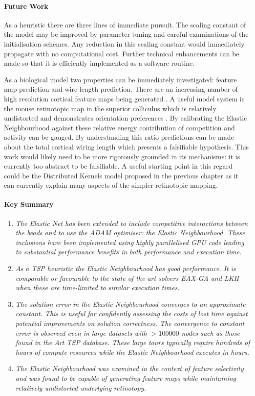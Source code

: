 \paragraph{Future Work}
As a heuristic there are three lines of immediate pursuit. The scaling constant of the model may be improved by parameter tuning and careful examinations of the initialisation schemes. Any reduction in this scaling constant would immediately propagate with no computational cost. Further technical enhancements can be made so that it is efficiently implemented as a software routine.

As a biological model two properties can be immediately investigated: feature map prediction and wire-length prediction. There are an increasing number of high resolution cortical feature maps being generated \cite{Bednar2016-lg}. A useful model system is the mouse retinotopic map in the superior colliculus which is relatively undistorted and demonstrates orientation preferences \cite{Feinberg2014-mj}. By calibrating the Elastic Neighbourhood against these relative energy contribution of competition and activity can be gauged. By understanding this ratio predictions can be made about the total cortical wiring length which presents a falsifiable hypothesis. This work would likely need to be more rigorously grounded in its mechanisms: it is currently too abstract to be falsifiable. A useful starting point in this regard could be the Distributed Kernels model proposed in the previous chapter as it can currently explain many aspects of the simpler retinotopic mapping.

\paragraph{Key Summary}
\begin{enumerate}
	\item \textit{The Elastic Net has been extended to include competitive interactions between the beads and to use the ADAM optimiser: the Elastic Neighbourhood. These inclusions have been implemented using highly parallelised GPU code leading to substantial performance benefits in both performance and execution time.}
	\item \textit{As a TSP heuristic the Elastic Neighbourhood has good performance. It is comparable or favourable to the state of the art solvers EAX-GA and LKH when these are time-limited to similar execution times.}
	\item \textit{The solution error in the Elastic Neighbourhood converges to an approximate constant. This is useful for confidently assessing the costs of lost time against potential improvements on solution correctness. The convergence to constant error is observed even in large datasets with $>100000$ nodes such as those found in the Art TSP database. These large tours typically require hundreds of hours of compute resources while the Elastic Neighbourhood executes in hours.}
	\item \textit{The Elastic Neighbourhood was examined in the context of feature selectivity and was found to be capable of generating feature maps while maintaining relatively undistorted underlying retinotopy.}
\end{enumerate}